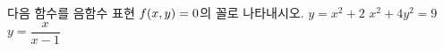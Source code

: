다음 함수를 음함수 표현 $f(x{,}\mkern3mu\mathopen{}y)=0$의 꼴로 나타내시오.
 $y=x^2+2$
 $x^2+4y^2=9$
 $y=\dfrac{x}{x-1}$
